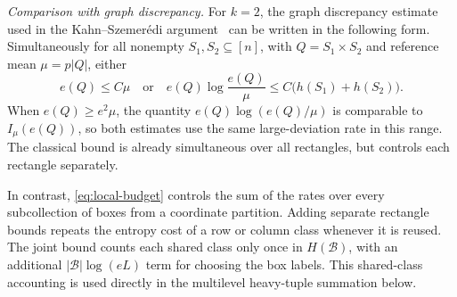 \documentclass[11pt,reqno]{amsart}
\numberwithin{equation}{section}
\theoremstyle{definition}
\theoremstyle{remark}
\begin{document}
\smallskip\noindent\emph{Comparison with graph discrepancy.}
For $k=2$, the graph discrepancy estimate used in the
Kahn--Szemer\'edi argument~\cite{FO05,LR15} can be written in the
following form. Simultaneously for all nonempty $S_1,S_2\subseteq[n]$,
with $Q=S_1\times S_2$ and reference mean $\mu=p|Q|$, either
\[
 e(Q)\le C\mu
 \quad\text{or}\quad
 e(Q)\log\frac{e(Q)}{\mu}
 \le C\bigl(h(S_1)+h(S_2)\bigr).
\]
When $e(Q)\ge e^2\mu$, the quantity $e(Q)\log(e(Q)/\mu)$ is comparable
to $I_\mu(e(Q))$, so both estimates use the same large-deviation rate
in this range. The classical bound is already simultaneous over all
rectangles, but controls each rectangle separately.

In contrast, \eqref{eq:local-budget} controls the sum of the rates over
every subcollection of boxes from a coordinate partition. Adding
separate rectangle bounds repeats the entropy cost of a row or column
class whenever it is reused. The joint bound counts each shared class
only once in $H(\mathcal B)$, with an additional
$|\mathcal B|\log(eL)$ term for choosing the box labels.
This shared-class accounting is used directly in the multilevel
heavy-tuple summation below.
\end{document}
